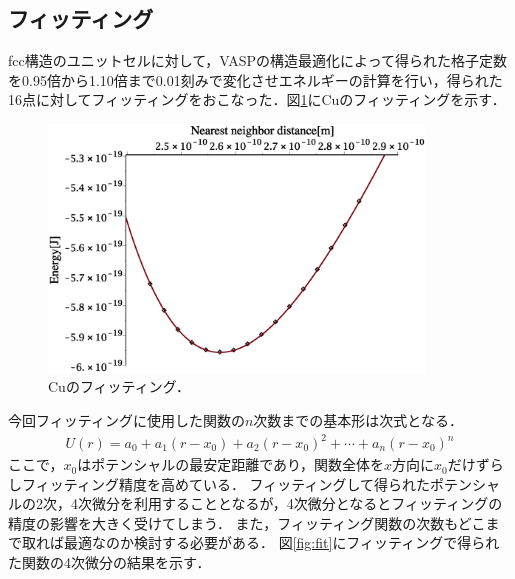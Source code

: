 \subsection{フィッティング}
fcc構造のユニットセルに対して，VASPの構造最適化によって得られた格子定数を0.95倍から1.10倍まで0.01刻みで変化させエネルギーの計算を行い，得られた16点に対してフィッティングをおこなった．図\ref{fig:examplefit}にCuのフィッティングを示す．
\begin{figure}[htbp]
 \begin{center}
  \includegraphics[width=100mm]{../image/fit5.eps}
 \end{center}
 \caption{Cuのフィッティング．}
 \label{fig:examplefit}
\end{figure}
今回フィッティングに使用した関数の$n$次数までの基本形は次式となる．
\begin{eqnarray}
\label{eq:method2}
U(r)=a_0+a_1(r-x_0)+a_2(r-x_0)^2+\cdots+a_n(r-x_0)^n
\end{eqnarray}
ここで，$x_0$はポテンシャルの最安定距離であり，関数全体を$x$方向に$x_0$だけずらしフィッティング精度を高めている．
フィッティングして得られたポテンシャルの2次，4次微分を利用することとなるが，4次微分となるとフィッティングの精度の影響を大きく受けてしまう．
また，フィッティング関数の次数もどこまで取れば最適なのか検討する必要がある．
図\ref{fig:fit}にフィッティングで得られた関数の4次微分の結果を示す．

